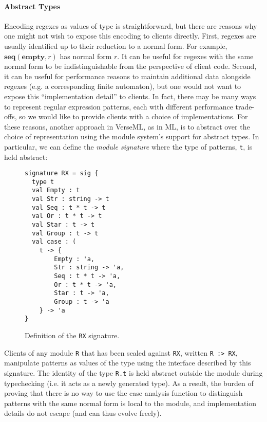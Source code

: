 {{\paragraph{Abstract Types} Encoding regexes as values of type  is straightforward, but there are reasons why one might not wish to expose this encoding to clients directly. First, regexes are usually identified up to their reduction to a normal form. For example, $\textbf{seq}(\textbf{empty}, r)$ has normal form $r$. It can be useful for regexes with the same normal form to be  indistinguishable from the perspective of client code. Second, it can be useful for performance reasons to maintain additional data alongside regexes (e.g. a corresponding finite automaton), but one would not want to expose this ``implementation detail'' to clients. In fact, there may be many ways to represent regular expression patterns, each with different performance trade-offs, so we would like to provide clients with a choice of implementations. For these reasons, another approach in VerseML, as in ML, is to abstract over the choice of representation using  the module system's support for abstract types. In particular, we can define the \emph{module signature}  where the type of patterns, \lstinline{t}, is held abstract:

\begin{figure}[ht]
\begin{lstlisting}[deletekeywords={case},numbers=none]
signature RX = sig {
  type t
  val Empty : t
  val Str : string -> t
  val Seq : t * t -> t
  val Or : t * t -> t
  val Star : t -> t
  val Group : t -> t
  val case : (
    t -> {
    	Empty : 'a,
    	Str : string -> 'a,
    	Seq : t * t -> 'a,
    	Or : t * t -> 'a,
    	Star : t -> 'a,
    	Group : t -> 'a
    } -> 'a
}
\end{lstlisting}
\caption{Definition of the \lstinline{RX} signature.}
\label{fig:signature-RX}
\end{figure}

 Clients of any module \lstinline{R} that has been sealed against \lstinline{RX}, written \lstinline{R :> RX}, manipulate patterns as values of the type  using the interface described by this signature. The identity of the type \lstinline{R.t} is held abstract outside the module during typechecking (i.e. it acts as a newly generated type). As a result, the burden of proving that there is no way to use the case analysis function to distinguish patterns with the same normal form is local to the module, and implementation details do not escape (and can thus evolve freely). %

}}
